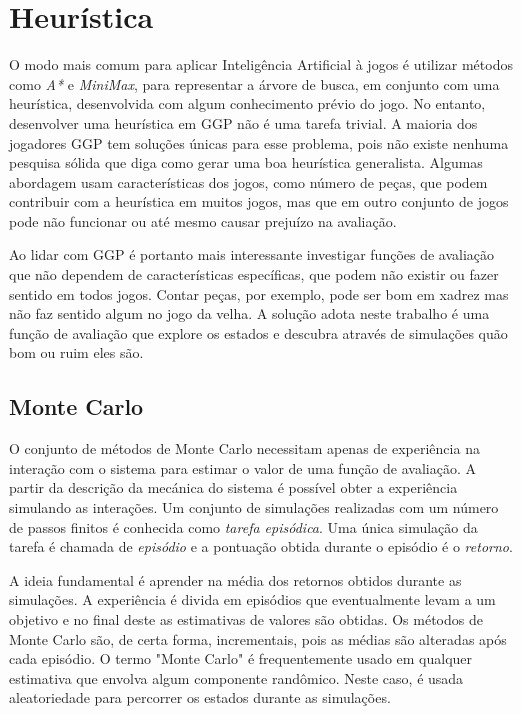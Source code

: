 \chapter{Heurística}
O modo mais comum para aplicar Inteligência Artificial à jogos é utilizar métodos como \textit{A*} e \textit{MiniMax}, para representar a árvore de busca, em conjunto com uma heurística, desenvolvida com algum conhecimento prévio do jogo. No entanto, desenvolver uma heurística em GGP não é uma tarefa trivial. A maioria dos jogadores GGP tem soluções únicas para esse problema, pois não existe nenhuma pesquisa sólida que diga como gerar uma boa heurística generalista. Algumas abordagem usam características dos jogos, como número de peças, que podem contribuir com a heurística em muitos jogos, mas que em outro conjunto de jogos pode não funcionar ou até mesmo causar prejuízo na avaliação.

Ao lidar com GGP é portanto mais interessante investigar funções de avaliação que não dependem de características específicas, que podem não existir ou fazer sentido em todos jogos. Contar peças, por exemplo, pode ser bom em xadrez mas não faz sentido algum no jogo da velha. A solução adota neste trabalho é uma função de avaliação que explore os estados e descubra através de simulações quão bom ou ruim eles são.


\section{Monte Carlo}
O conjunto de métodos de Monte Carlo\cite{rlearning} necessitam apenas de experiência na interação com o sistema para estimar o valor de uma função de avaliação. A partir da descrição da mecánica do sistema é possível obter a experiência simulando as interações. Um  conjunto de simulações realizadas com um número de passos finitos é conhecida como \textit{tarefa episódica}. Uma única simulação da tarefa é chamada de \textit{episódio} e a pontuação obtida durante o episódio é o \textit{retorno}. 

A ideia fundamental é aprender na média dos retornos obtidos durante as simulações. A experiência é divida em episódios que eventualmente levam a um objetivo e no final deste as estimativas de valores são obtidas. Os métodos de Monte Carlo são, de certa forma, incrementais, pois as médias são alteradas após cada episódio. O termo "Monte Carlo" é frequentemente usado em qualquer estimativa que envolva algum componente randômico. Neste caso, é usada aleatoriedade para percorrer os estados durante as simulações.

